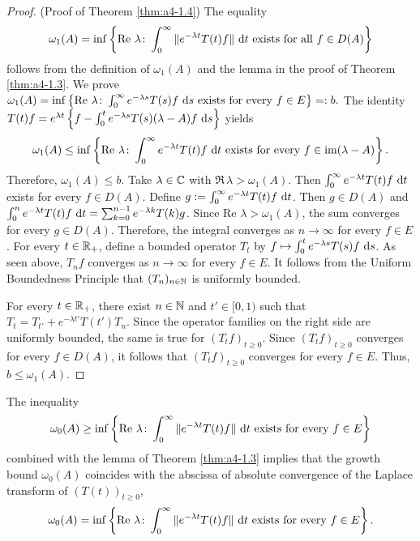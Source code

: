 \begin{proof}(Proof of Theorem \ref{thm:a4-1.4}) 
The equality 
 \[ 
 \omega_1(A) = \inf \left\{ \mathop{}\!\mathrm{Re}\,\,\lambda\colon\int_0^\infty \|e^{-\lambda t} T(t) f \| \,\mathop{}\!\mathrm{d}{t} \text{ exists for all } f \in D(A) \right\} 
 \] 
 follows from the definition of $\omega_1(A)$ and the lemma in the proof of Theorem \ref{thm:a4-1.3}.
We prove 
$
\omega_1(A) = \inf \left\{ \mathop{}\!\mathrm{Re}\,\,\lambda\colon\int_0^\infty e^{-\lambda s} T(s) f \,\mathop{}\!\mathrm{d}{s} \text{ exists for every } f \in E \right\}=: b. 
$
The identity
$    T(t) f = e^{\lambda t} \left\{ f - \int_0^t e^{-\lambda s} T(s) (\lambda - A) f \,\mathop{}\!\mathrm{d}{s} \right\}
$
yields
\[
\omega_1(A) \leq \inf \left\{ \mathop{}\!\mathrm{Re}\,\,\lambda\colon\int_0^\infty e^{-\lambda t} T(t) f \,\mathop{}\!\mathrm{d}{t} \text{ exists for every } f \in \text{im} (\lambda - A) \right\}.
\]
Therefore,
$\omega_1(A) \leq b.$
Take $\lambda \in \mathbb{C}$ with $\Re\,\lambda > \omega_1(A)$. 
Then $\int_0^\infty e^{-\lambda t} T(t) f \,\mathop{}\!\mathrm{d}{t}$ exists for every $f \in D(A)$. 
Define $g := \int_0^\infty e^{-\lambda t} T(t) f \,\mathop{}\!\mathrm{d}{t}$. 
Then $g \in D(A)$ and $\int_0^n e^{-\lambda t} T(t) f \,\mathop{}\!\mathrm{d}{t} = \sum_{k=0}^{n-1} e^{-\lambda k} T(k) g$. 
Since $\text{Re } \lambda > \omega_1(A)$, the sum converges for every $g \in D(A)$. 
Therefore, the integral converges as $n \to \infty$ for every $f \in E$.
For every $t \in \mathbb{R}_+$, define a bounded operator $T_t$ by $ f \mapsto \int_0^t e^{-\lambda s} T(s) f \,\mathop{}\!\mathrm{d}{s}$. 
As seen above, $T_n f$ converges as $n \to \infty$ for every $f \in E$. 
It follows from the Uniform Boundedness Principle that $(T_n)_{n \in \mathbb{N}}$ is uniformly bounded.
%


For every $t \in \mathbb{R}_+$, there exist $n \in \mathbb{N}$ and $t' \in [0,1)$ such that $T_t = T_{t'} + e^{-\lambda t'} T(t') T_n$. 
Since the operator families on the right side are uniformly bounded, the same is true for $(T_t f)_{t \geq 0}$. 
Since $(T_t f)_{t \geq 0}$ converges for every $f \in D(A)$, it follows that $(T_t f)_{t \geq 0}$ converges for every $f \in E$. 
Thus, $b \leq \omega_1(A)$.
\end{proof}

%


The inequality
\[
    \omega_{0}(A) \geq \inf \left\{ \text{Re } \lambda\colon\int_0^\infty \|e^{-\lambda t} T(t) f \| \,\mathop{}\!\mathrm{d}{t} 
    \text{ exists for every } f \in E \right\}
\]
combined with the lemma of Theorem \ref{thm:a4-1.3} implies that the growth bound $\omega_{0}(A)$ coincides with the abscissa of absolute convergence of the Laplace transform of $(T(t))_{t \geq 0}$, \ie
\begin{equation}\label{eq:a4-1.6}
   \omega_{0}(A) = \inf \left\{ \text{Re } \lambda\colon\int_0^\infty \|e^{-\lambda t} T(t) f \| \,\mathop{}\!\mathrm{d}{t} \text{ exists for every } f \in E \right\}.
\end{equation}
%


